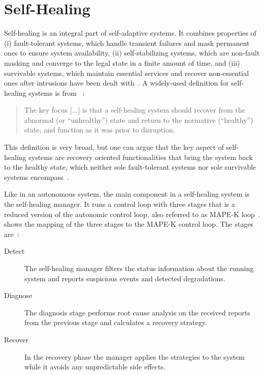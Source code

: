 
\section{Self-Healing}\label{sec:self-healing}
  Self-healing is an integral part of self-adaptive systems.
  It combines properties of
  (i) fault-tolerant systems, which handle transient failures and mask permanent ones to ensure system availability,
  (ii) self-stabilizing systems, which are non-fault masking and converge to the legal state in a finite amount of time, and 
  (iii) survivable systems, which maintain essential services and recover non-essential ones after intrusions have been dealt with~\cite{PsaierSurvey}.
  A widely-used definition for self-healing systems is from \citeauthor{Ghosh}~\cite{Ghosh}:

  \begin{quote}
    The key focus [...] is that a self-healing system should recover from the abnormal (or \enquote{unhealthy}) state and return to the normative (\enquote{healthy}) state, and function as it was prior to disruption.
  \end{quote}

  This definition is very broad, but one can argue that the key aspect of self-healing systems are recovery oriented functionalities that bring the system back to the healthy state, which neither sole fault-tolerant systems nor sole survivable systems encompass~\cite{PsaierSurvey}.

  Like in an autonomous system, the main component in a self-healing system is the self-healing manager.
  It runs a control loop with three stages that is a reduced version of the autonomic control loop, also referred to as MAPE-K loop~\cite{ibm_autonomic}.
   shows the mapping of the three stages to the MAPE-K control loop.
  The stages are~\cite{PsaierSurvey}:

  \begin{description}
    \item[Detect] The self-healing manager filters the status information about the running system and reports suspicious events and detected degradations.
    \item[Diagnose] The diagnosis stage performs root cause analysis on the received reports from the previous stage and calculates a recovery strategy.
    \item[Recover] In the recovery phase the manager applies the strategies to the system while it avoids any unpredictable side effects.
  \end{description}

